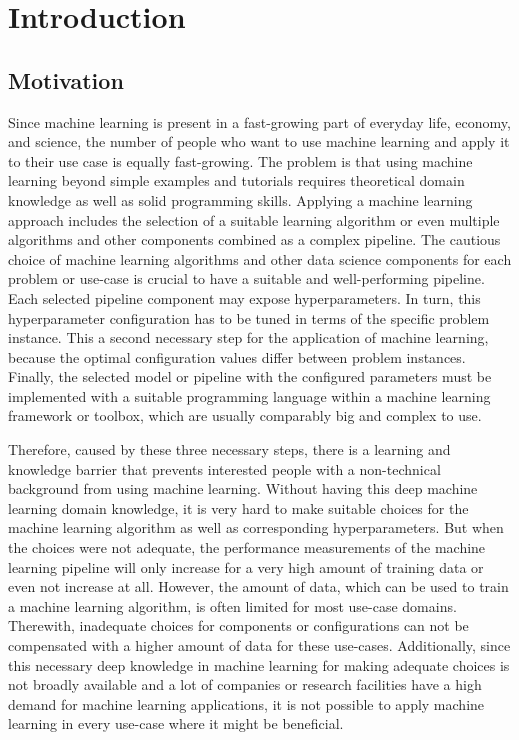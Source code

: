 %
\chapter{Introduction}
\label{sec:intro}

\section{Motivation}
\label{sec:intro:motivation}

Since machine learning is present in a fast-growing part of everyday life, economy, and science, the number of people who want to use machine learning and apply it to their use case is equally fast-growing.
The problem is that using machine learning beyond simple examples and tutorials requires theoretical domain knowledge as well as solid programming skills.\newline
Applying a machine learning approach includes the selection of a suitable learning algorithm or even multiple algorithms and other components combined as a complex pipeline.
The cautious choice of machine learning algorithms and other data science components for each problem or use-case is crucial to have a suitable and well-performing pipeline.\newline
Each selected pipeline component may expose hyperparameters.
In turn, this hyperparameter configuration has to be tuned in terms of the specific problem instance.
This a second necessary step for the application of machine learning, because the optimal configuration values differ between problem instances.\newline
Finally, the selected model or pipeline with the configured parameters must be implemented with a suitable programming language within a machine learning framework or toolbox, which are usually comparably big and complex to use.

Therefore, caused by these three necessary steps, there is a learning and knowledge barrier that prevents interested people with a non-technical background from using machine learning.
Without having this deep machine learning domain knowledge, it is very hard to make suitable choices for the machine learning algorithm as well as corresponding hyperparameters.\newline
But when the choices were not adequate, the performance measurements of the machine learning pipeline will only increase for a very high amount of training data or even not increase at all.
However, the amount of data, which can be used to train a machine learning algorithm, is often limited for most use-case domains.
Therewith, inadequate choices for components or configurations can not be compensated with a higher amount of data for these use-cases.
Additionally, since this necessary deep knowledge in machine learning for making adequate choices is not broadly available and a lot of companies or research facilities have a high demand for machine learning applications, it is not possible to apply machine learning in every use-case where it might be beneficial.

